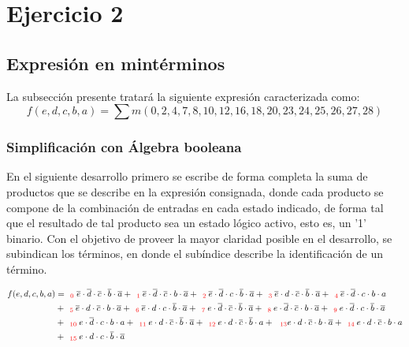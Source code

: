 \section{Ejercicio 2}

\newcommand{\subindex}[1]{_{\ \ \color{red} #1}}

\subsection{Expresi\'on en mint\'erminos}
La subsecci\'on presente tratar\'a la siguiente expresi\'on caracterizada como:
\begin{equation*}
    f(e,d,c,b,a) = \sum m(0,2,4,7,8,10,12,16,18,20,23,24,25,26,27,28)
\end{equation*}


\subsubsection{Simplificación con Álgebra booleana}
En el siguiente desarrollo primero se escribe de forma completa la suma de productos que se describe en la expresi\'on
consignada, donde cada producto se compone de la combinaci\'on de entradas en cada estado indicado, de forma tal que el resultado 
de tal producto sea un estado l\'ogico activo, esto es, un '1' binario. Con el objetivo de proveer la mayor claridad posible en el desarrollo,
se subindican los t\'erminos, en donde el sub\'indice describe la identificaci\'on de un t\'ermino.

\begin{align*}
f(e,d,c,b,a) & =  \subindex{0} {\overline{e} \cdot \overline{d} \cdot \overline{c} \cdot \overline{b} \cdot \overline{a}}
+ \subindex{1} {\overline{e} \cdot \overline{d} \cdot \overline{c} \cdot b \cdot \overline{a}} 
+ \subindex{2} {\overline{e} \cdot \overline{d}  \cdot c \cdot \overline{b} \cdot \overline{a}}  
+ \subindex{3} {\overline{e} \cdot d \cdot \overline{c} \cdot \overline{b} \cdot \overline{a}} 
+ \subindex{4} {\overline{e} \cdot \overline{d} \cdot c \cdot b \cdot a} \\
& + \subindex{5} {\overline{e} \cdot d \cdot \overline{c} \cdot b \cdot \overline{a}} 
+ \subindex{6} {\overline{e} \cdot d \cdot c \cdot \overline{b} \cdot \overline{a}}
+ \subindex{7} {e \cdot \overline{d} \cdot \overline{c} \cdot \overline{b} \cdot \overline{a}} 
+ \subindex{8} {e \cdot \overline{d} \cdot \overline{c} \cdot b \cdot \overline{a}}
+ \subindex{9} {e \cdot \overline{d} \cdot c \cdot \overline{b} \cdot \overline{a}} \\
& + \subindex{10} {e \cdot \overline{d} \cdot c \cdot b \cdot a}
+ \subindex{11} {e \cdot d \cdot \overline{c} \cdot \overline{b} \cdot \overline{a}}
+ \subindex{12} {e \cdot d \cdot \overline{c} \cdot \overline{b} \cdot a} 
+ {\subindex{13} e \cdot d \cdot \overline{c} \cdot b \cdot \overline{a}} 
+ \subindex{14} {e \cdot d \cdot \overline{c} \cdot b \cdot a} \\
& + \subindex{15} {e \cdot d \cdot c \cdot \overline{b} \cdot \overline{a}}
\end{align*}


